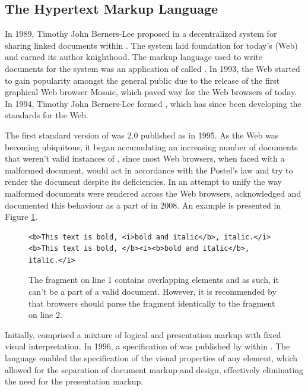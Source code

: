 \documentclass{book}
\begin{document}
\subsection{The Hypertext Markup Language}
In 1989, Timothy John Berners-Lee proposed in \cite{bernerslee89} a
decentralized system for sharing linked documents within .  The
system laid foundation for today's  (Web) and earned
its author knighthood. The markup language used to write documents for the
system was an application of  called . In 1993, the
Web started to gain popularity amongst the general public due to the release of
the first graphical Web browser Mosaic, which paved way for the Web browsers of
today. In 1994, Timothy John Berners-Lee formed , which has since
been developing the standards for the Web.

The first standard version of  was  2.0 published as
\cite{rfc1866} in 1995. As the Web was becoming ubiquitous, it began
accumulating an increasing number of documents that weren't valid instances of
, since most Web browsers, when faced with a malformed document,
would act in accordance with the Postel's law and try to render the document
despite its deficiencies. In an attempt to unify the way malformed
 documents were rendered across the Web browsers, 
acknowledged and documented this behaviour as a part of \cite[Section~8.2,
Parsing HTML documents]{hickson14} in 2008. An example is presented in Figure
\ref{fig:overlapping-elements}.

\begin{figure}[b]
  \begin{verbatim}
<b>This text is bold, <i>bold and italic</b>, italic.</i>
<b>This text is bold, </b><i><b>bold and italic</b>, italic.</i>
  \end{verbatim}
  \caption{The fragment on line 1 contains overlapping elements and as such, it
    can't be a part of a valid  document.  However, it is
    recommended by  that browsers should parse the fragment
    identically to the fragment on line 2.}
  \label{fig:overlapping-elements}
\end{figure}

Initially,  comprised a mixture of logical and presentation markup
with fixed visual interpretation. In 1996, a specification of  was
published by  within \cite{lie96}. The language enabled the
specification of the visual properties of any element, which allowed for the
separation of document markup and design, effectively eliminating the need for
the presentation markup.
\end{document}
